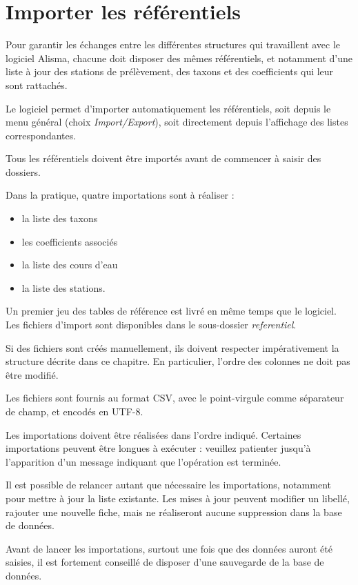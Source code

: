 \chapter{Importer les référentiels}

Pour garantir les échanges entre les différentes structures qui travaillent avec le logiciel Alisma, chacune doit disposer des mêmes référentiels, et notamment d'une liste à jour des stations de prélèvement, des taxons et des coefficients qui leur sont rattachés.

Le logiciel permet d'importer automatiquement les référentiels, soit depuis le menu général (choix \textit{Import/Export}), soit directement depuis l'affichage des listes correspondantes.

Tous les référentiels doivent être importés avant de commencer à saisir des dossiers.

Dans la pratique, quatre importations sont à réaliser : 
\begin{itemize}
\item la liste des taxons
\item les coefficients associés
\item la liste des cours d'eau
\item la liste des stations.
\end{itemize}

Un premier jeu des tables de référence est livré en même temps que le logiciel. Les fichiers d'import sont disponibles dans le sous-dossier \textit{referentiel}.

Si des fichiers sont créés manuellement, ils doivent respecter impérativement la structure décrite dans ce chapitre. En particulier, l'ordre des colonnes ne doit pas être modifié.

Les fichiers sont fournis au format CSV, avec le point-virgule comme séparateur de champ, et encodés en UTF-8.

Les importations doivent être réalisées dans l'ordre indiqué. Certaines importations peuvent être longues à exécuter : veuillez patienter jusqu'à l'apparition d'un message indiquant que l'opération est terminée.

Il est possible de relancer autant que nécessaire les importations, notamment pour mettre à jour la liste existante. Les mises à jour peuvent modifier un libellé, rajouter une nouvelle fiche, mais ne réaliseront aucune suppression dans la base de données.

Avant de lancer les importations, surtout une fois que des données auront été saisies, il est fortement conseillé de disposer d'une sauvegarde de la base de données.

